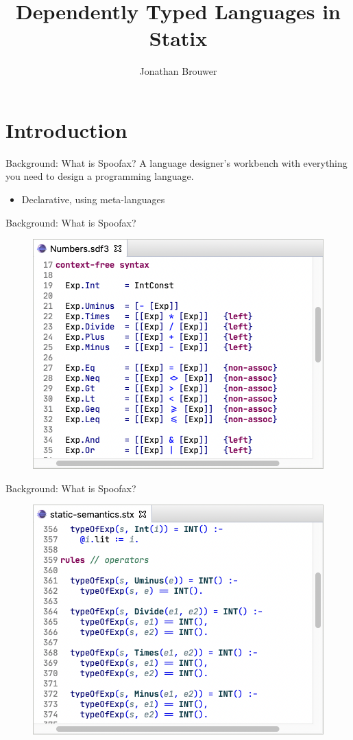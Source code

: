 \documentclass[aspectratio=43]{beamer}
\title[]{Dependently Typed Languages in Statix}
\institute[]{Delft University of Technology, The Netherlands}
\author{Jonathan Brouwer}
\begin{document}
\section{Introduction}
{
\frame{\titlepage}
}

\begin{frame}[fragile]{Background: What is Spoofax?}
	A language designer's workbench with everything you need to design a programming language.
	\begin{itemize}
		\item Declarative, using meta-languages
	\end{itemize}
\end{frame}

\begin{frame}[fragile]{Background: What is Spoofax?}
\begin{figure}
	\includegraphics[width=0.8\linewidth]{img/syntax}
\end{figure}
\end{frame}

\begin{frame}[fragile]{Background: What is Spoofax?}
	\begin{figure}
		\includegraphics[width=0.8\linewidth]{img/semantics}
	\end{figure}
\end{frame}
\end{document}
